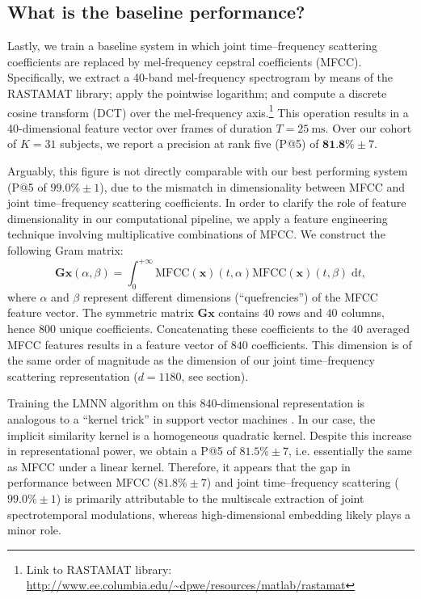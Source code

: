 \documentclass{bmcart}
\newcommand{\lnameref}[1]{%
\bgroup
\let\nmu\MakeLowercase
\nameref{#1}\egroup}
\newcommand{\nmu}{}
\begin{document}
\subsection*{What is the baseline performance?}
Lastly, we train a baseline system in which joint time--frequency scattering coefficients are replaced by mel-frequency cepstral coefficients (MFCC).
Specifically, we extract a 40-band mel-frequency spectrogram by means of the RASTAMAT library; apply the pointwise logarithm; and compute a discrete cosine transform (DCT) over the mel-frequency axis.\footnote{Link to RASTAMAT library: \url{http://www.ee.columbia.edu/~dpwe/resources/matlab/rastamat}}
This operation results in a 40-dimensional feature vector over frames of duration $T=\SI{25}{\milli\second}$.
Over our cohort of $K=31$ subjects, we report a precision at rank five (P@5) of $\textbf{81.8\%} \pm 7$.

Arguably, this figure is not directly comparable with our best performing system (P@5 of $99.0\%\pm 1$), due to the mismatch in dimensionality between MFCC and joint time--frequency scattering coefficients.
In order to clarify the role of feature dimensionality in our computational pipeline, we apply a feature engineering technique involving multiplicative combinations of MFCC.
We construct the following Gram matrix:
\begin{equation}
\mathbf{G} \boldsymbol{x}(\alpha, \beta) =
\int_0^{+\infty}
\mathrm{MFCC}(\boldsymbol{x})(t, \alpha)
\mathrm{MFCC}(\boldsymbol{x})(t, \beta)
\;\mathrm{d}t,
\end{equation}
where $\alpha$ and $\beta$ represent different dimensions (``quefrencies'') of the MFCC feature vector.
The symmetric matrix $\mathbf{G}\boldsymbol{x}$ contains $40$ rows and $40$ columns, hence $800$ unique coefficients.
Concatenating these coefficients to the $40$ averaged MFCC features results in a feature vector of $840$ coefficients.
This dimension is of the same order of magnitude as the dimension of our joint time--frequency scattering representation ($d=1180$, see \lnameref{sec:methods} section).

Training the LMNN algorithm on this 840-dimensional representation is analogous to a ``kernel trick'' in support vector machines \cite{chang2010jmlr}.
In our case, the implicit similarity kernel is a homogeneous quadratic kernel.
Despite this increase in representational power, we obtain a P@5 of $81.5\% \pm 7$, i.e. essentially the same as MFCC under a linear kernel.
Therefore, it appears that the gap in performance between MFCC ($81.8\%\pm 7$) and joint time--frequency scattering ($99.0\% \pm 1$) is primarily attributable to the multiscale extraction of joint spectrotemporal modulations, whereas high-dimensional embedding likely plays a minor role.
\end{document}
